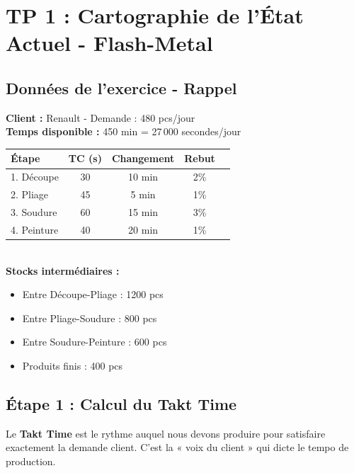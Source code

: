 \documentclass[12pt,a4paper]{article}
\begin{document}
\newpage

\section{TP 1 : Cartographie de l'État Actuel - Flash-Metal}

\subsection{Données de l'exercice - Rappel}

\begin{tcolorbox}[colback=lightgray,colframe=black,title=Données Flash-Metal]
\textbf{Client :} Renault - Demande : 480 pcs/jour\\
\textbf{Temps disponible :} 450 min = 27\,000 secondes/jour\\[0.3cm]

\renewcommand{\arraystretch}{1.3}
\begin{tabular}{lcccc}
\toprule
\textbf{Étape} & \textbf{TC (s)} & \textbf{Changement} & \textbf{Rebut} \\
\midrule
1. Découpe & 30 & 10 min & 2\% \\
2. Pliage & 45 & 5 min & 1\% \\
3. Soudure & 60 & 15 min & 3\% \\
4. Peinture & 40 & 20 min & 1\% \\
\bottomrule
\end{tabular}\\[0.3cm]

\textbf{Stocks intermédiaires :}
\begin{itemize}[nosep]
    \item Entre Découpe-Pliage : 1200 pcs
    \item Entre Pliage-Soudure : 800 pcs
    \item Entre Soudure-Peinture : 600 pcs
    \item Produits finis : 400 pcs
\end{itemize}
\end{tcolorbox}

\subsection{Étape 1 : Calcul du Takt Time}

\begin{tcolorbox}[pedagogique]
Le \textbf{Takt Time} est le rythme auquel nous devons produire pour satisfaire exactement la demande client. C'est la « voix du client » qui dicte le tempo de production.
\end{tcolorbox}
\end{document}
